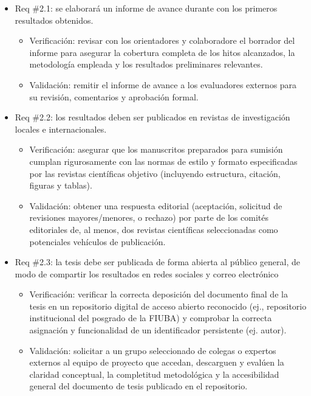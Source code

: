 \documentclass[
11pt, %
]{charter}
\begin{document}
\begin{itemize}
    \item Req \#2.1: se elaborará un informe de avance durante con los primeros resultados obtenidos.
    \begin{itemize}
        \item Verificación: revisar con los orientadores y colaboradore el borrador del informe para asegurar la cobertura completa de los hitos alcanzados, la metodología empleada y los resultados preliminares relevantes.
        \item Validación: remitir el informe de avance a los evaluadores externos para su revisión, comentarios y aprobación formal.
    \end{itemize}

    \item Req \#2.2: los resultados deben ser publicados en revistas de investigación locales e internacionales.
    \begin{itemize}
        \item Verificación: asegurar que los manuscritos preparados para sumisión cumplan rigurosamente con las normas de estilo y formato especificadas por las revistas científicas objetivo (incluyendo estructura, citación, figuras y tablas).
        \item Validación: obtener una respuesta editorial (aceptación, solicitud de revisiones mayores/menores, o rechazo) por parte de los comités editoriales de, al menos, dos revistas científicas seleccionadas como potenciales vehículos de publicación.
    \end{itemize}

    \item Req \#2.3: la tesis debe ser publicada de forma abierta al público general, de modo de compartir los resultados en redes sociales y correo electrónico
    \begin{itemize}
        \item Verificación: verificar la correcta deposición del documento final de la tesis en un repositorio digital de acceso abierto reconocido (ej., repositorio institucional del posgrado de la FIUBA) y comprobar la correcta asignación y funcionalidad de un identificador persistente (ej. autor).
        \item Validación: solicitar a un grupo seleccionado de colegas o expertos externos al equipo de proyecto que accedan, descarguen y evalúen la claridad conceptual, la completitud metodológica y la accesibilidad general del documento de tesis publicado en el repositorio.
    \end{itemize}
\end{itemize}
\end{document}
